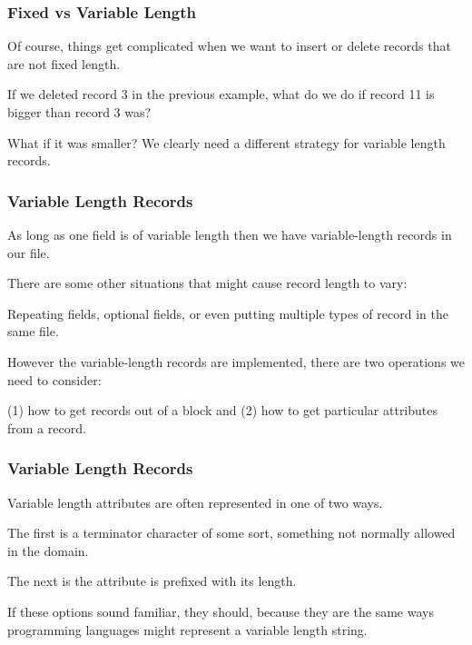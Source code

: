 \begin{frame}
\frametitle{Fixed vs Variable Length}

Of course, things get complicated when we want to insert or delete records that are not fixed length. 

If we deleted record 3 in the previous example, what do we do if record 11 is bigger than record 3 was? 

What if it was smaller? We clearly need a different strategy for variable length records.


\end{frame}


\begin{frame}
\frametitle{Variable Length Records}

As long as one field is of variable length then we have variable-length records in our file. 

There are some other situations that might cause record length to vary: 

Repeating fields, optional fields, or even putting multiple types of record in the same file. 

However the variable-length records are implemented, there are two operations we need to consider: 

(1) how to get records out of a block and (2) how to get particular attributes from a record.

\end{frame}


\begin{frame}
\frametitle{Variable Length Records}

Variable length attributes are often represented in one of two ways. 

The first is a terminator character of some sort, something not normally allowed in the domain. 

The next is the attribute is prefixed with its length. 

If these options sound familiar, they should, because they are the same ways programming languages might represent a variable length string.


\end{frame}


